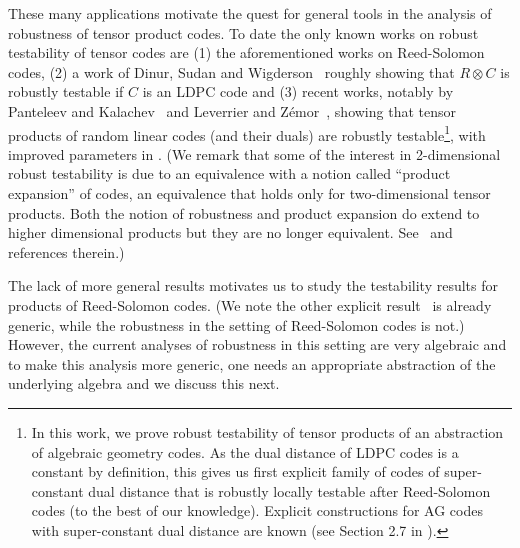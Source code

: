 \documentclass[11pt]{article}
\newcommand{\mnote}[1]{{\color{teal} [Madhu: #1]}}
\newcommand{\mnote}[1]{}
\begin{document}
These many applications motivate the quest for general tools in the analysis of robustness of tensor product codes. To date the only known works on robust testability of tensor codes are (1) the aforementioned works on Reed-Solomon codes, (2) a work of Dinur, Sudan and Wigderson~\cite{DSW} roughly showing that $R \otimes C$ is robustly testable if $C$ is an LDPC code and (3) recent works, notably by Panteleev and Kalachev~\cite{PanKal} and Leverrier and Z\'emor~\cite{LevZem}, showing that tensor products of random linear codes (and their duals) are robustly testable\footnote{In this work, we prove robust testability of tensor products of an abstraction of algebraic geometry codes. As the dual distance of LDPC codes is a constant by definition, this gives us first explicit family of codes of super-constant dual distance that is robustly locally testable after Reed-Solomon codes (to the best of our knowledge). Explicit constructions for AG codes  with super-constant dual distance are known (see Section 2.7 in \cite{hoholdt1998algebraic}). }, with improved parameters in \cite{KalPan:2-local,DinurHLV23}. (We remark that some of the interest in 2-dimensional robust testability is due to an equivalence with a notion called  ``product expansion'' of codes, an equivalence that holds only for two-dimensional tensor products. Both the notion of robustness and product expansion do extend to higher dimensional products but they are no longer equivalent. See~\cite{KalPan:3-local} and references therein.)




The lack of more general results motivates us to study the testability results for products of Reed-Solomon codes. (We note the other explicit result~\cite{DSW} is already generic, while the robustness in the setting of Reed-Solomon codes is not.) However, the current analyses of robustness in this setting are very algebraic and to make this analysis more generic, one needs an appropriate abstraction of the underlying algebra and we discuss this next.
\end{document}
